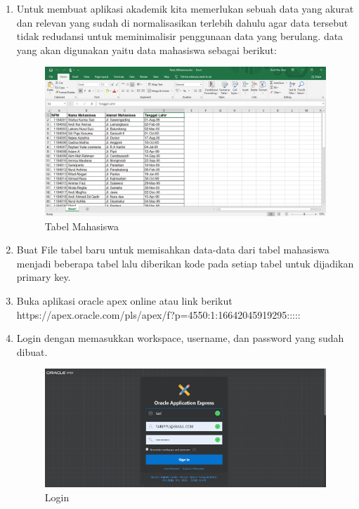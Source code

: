 \begin{enumerate}
    \item Untuk membuat aplikasi akademik kita memerlukan sebuah data yang akurat dan relevan yang sudah di normalisasikan terlebih dahulu agar data tersebut tidak redudansi untuk meminimalisir penggunaan data yang berulang. data yang akan digunakan yaitu data mahasiswa sebagai berikut:
    \begin{figure}[!htbp]
        \centering
        \includegraphics[width=15cm]{figures/01.PNG}
        \caption{Tabel Mahasiswa}
    \end{figure}
    
    \item Buat File tabel baru untuk memisahkan data-data dari tabel mahasiswa menjadi beberapa tabel lalu diberikan kode pada setiap tabel untuk dijadikan primary key.

    
    \item Buka aplikasi oracle apex online atau link berikut\\ https://apex.oracle.com/pls/apex/f?p=4550:1:16642045919295:::::

    \item Login dengan memasukkan workspace, username, dan password yang sudah dibuat.
    \begin{figure}[!htbp]
        \centering
        \includegraphics[width=13cm]{figures/login.PNG}
        \caption{Login}
    \end{figure}
    

\end{enumerate}
